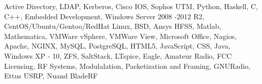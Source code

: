
\begin{cventries}
    \begin{cvitems}
    \item {Active Directory, LDAP, Kerberos, Cisco IOS, Sophos UTM, Python, Haskell, C, C++, Embedded Development, Windows Server 2008 -2012 R2, CentOS/Ubuntu/Gentoo/RedHat Linux, BSD, Ansys HFSS, Matlab, Mathematica, VMWare vSphere, VMWare View, Microsoft Office, Nagios, Apache, NGINX, MySQL, PostgreSQL, HTML5, JavaScript, CSS, Java, Windows XP - 10, ZFS, SaltStack, LTspice, Eagle, Amateur Radio, FCC Licensing, RF Systems, Modulalation, Packetization and Framing, GNURadio, Ettus USRP, Nuand BladeRF}
    \end{cvitems}
\end{cventries}

